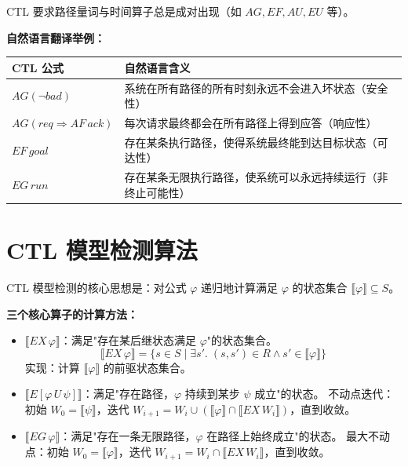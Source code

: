 \documentclass[UTF8,openany,12pt]{ctexbook}
\theoremstyle{remark}
\begin{document}
CTL 要求路径量词与时间算子总是成对出现（如 $AG, EF, AU, EU$ 等）。

\textbf{自然语言翻译举例：}

\begin{center}
\begin{tabular}{@{}ll@{}}
\toprule
CTL 公式 & 自然语言含义 \\
\midrule
$AG(\neg \mathit{bad})$ & 系统在所有路径的所有时刻永远不会进入坏状态（安全性） \\
$AG(\mathit{req} \Rightarrow AF\, \mathit{ack})$ & 每次请求最终都会在所有路径上得到应答（响应性） \\
$EF\, \mathit{goal}$ & 存在某条执行路径，使得系统最终能到达目标状态（可达性） \\
$EG\, \mathit{run}$ & 存在某条无限执行路径，使系统可以永远持续运行（非终止可能性） \\
\bottomrule
\end{tabular}
\end{center}

\section{CTL 模型检测算法}

CTL 模型检测的核心思想是：对公式 $\varphi$ 递归地计算满足 $\varphi$ 的状态集合 $\llbracket \varphi \rrbracket \subseteq S$。

\textbf{三个核心算子的计算方法：}

\begin{itemize}
  \item $\llbracket EX\, \varphi \rrbracket$：满足"存在某后继状态满足 $\varphi$"的状态集合。
    \[
      \llbracket EX\, \varphi \rrbracket = \{s \in S \mid \exists s'.\; (s,s') \in R \wedge s' \in \llbracket \varphi \rrbracket\}
    \]
    实现：计算 $\llbracket \varphi \rrbracket$ 的前驱状态集合。

  \item $\llbracket E[\varphi\, U\, \psi] \rrbracket$：满足"存在路径，$\varphi$ 持续到某步 $\psi$ 成立"的状态。
    不动点迭代：初始 $W_0 = \llbracket \psi \rrbracket$，迭代 $W_{i+1} = W_i \cup (\llbracket \varphi \rrbracket \cap \llbracket EX\, W_i \rrbracket)$，直到收敛。

  \item $\llbracket EG\, \varphi \rrbracket$：满足"存在一条无限路径，$\varphi$ 在路径上始终成立"的状态。
    最大不动点：初始 $W_0 = \llbracket \varphi \rrbracket$，迭代 $W_{i+1} = W_i \cap \llbracket EX\, W_i \rrbracket$，直到收敛。
\end{itemize}
\end{document}
